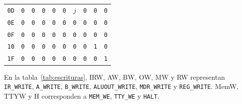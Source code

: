 \documentclass[11pt,a4paper]{article}
\newcommand{\sig}[1]{\texttt{#1}}
\begin{document}
\begin{center}
\begin{tabular}{@{}lccccccccc@{}}
\texttt{0D} & \texttt{0} & \texttt{0} & \texttt{0} & \texttt{0} & \texttt{0} & $j$ & \texttt{0} & \texttt{0} & \texttt{0} \\
\texttt{0E} & \texttt{0} & \texttt{0} & \texttt{0} & \texttt{0} & \texttt{0} & \texttt{0} & \texttt{0} & \texttt{0} & \texttt{0} \\
\texttt{0F} & \texttt{0} & \texttt{0} & \texttt{0} & \texttt{0} & \texttt{0} & \texttt{0} & \texttt{0} & \texttt{0} & \texttt{0} \\
\texttt{10} & \texttt{0} & \texttt{0} & \texttt{0} & \texttt{0} & \texttt{0} & \texttt{0} & \texttt{0} & \texttt{1} & \texttt{0} \\
\texttt{1F} & \texttt{0} & \texttt{0} & \texttt{0} & \texttt{0} & \texttt{0} & \texttt{0} & \texttt{0} & \texttt{0} & \texttt{1} \\
\bottomrule
\end{tabular}
\label{tab:escrituras}
\end{center}

En la tabla~\ref{tab:escrituras}, IRW, AW, BW, OW, MW y RW representan
\sig{IR\_WRITE}, \sig{A\_WRITE}, \sig{B\_WRITE}, \sig{ALUOUT\_WRITE},
\sig{MDR\_WRITE} y \sig{REG\_WRITE}. MemW, TTYW y H corresponden a
\sig{MEM\_WE}, \sig{TTY\_WE} y \sig{HALT}.
\end{document}
